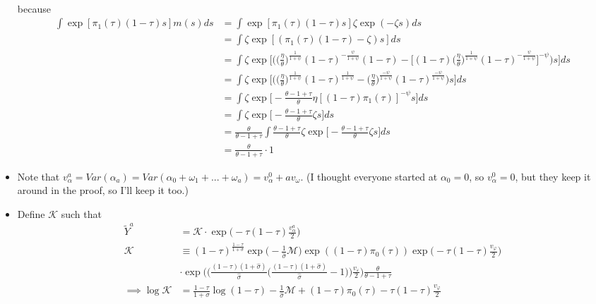 \documentclass{article}
\newcommand{\M}{\mathcal{M}}
\begin{document}
\begin{itemize}
\begin{align*}
\end{align*}
because
\begin{align*}
\int \exp[  \pi_1(\tau)  (1-\tau)s ] m(s)ds 
&= \int \exp[  \pi_1(\tau)  (1-\tau)s ] \zeta \exp(-\zeta s) ds \\
&= \int \zeta \exp[(\pi_1(\tau)  (1-\tau)-\zeta) s] ds \\
&= \int \zeta \exp\Bigg[\Bigg(\Bigg( \frac{\eta}{\theta} \Bigg)^{\frac{1}{1+\psi}}(1-\tau)^{-\frac{\psi}{1+\psi}}  (1-\tau)-\Big[(1-\tau)\Bigg( \frac{\eta}{\theta} \Bigg)^{\frac{1}{1+\psi}}(1-\tau)^{-\frac{\psi}{1+\psi}}\Big]^{-\psi}\Bigg) s\Bigg] ds \\
&= \int \zeta \exp\Bigg[\Bigg(\Bigg( \frac{\eta}{\theta} \Bigg)^{\frac{1}{1+\psi}}(1-\tau)^{\frac{1}{1+\psi}}  -\Bigg( \frac{\eta}{\theta} \Bigg)^{\frac{-\psi}{1+\psi}}(1-\tau)^{\frac{ - \psi}{1+\psi}}\Bigg) s\Bigg] ds \\
&= \int \zeta \exp\Bigg[- \frac{\theta - 1 + \tau}{\theta}\eta[(1-\tau)\pi_1(\tau)]^{-\psi} s\Bigg] ds \\
&= \int \zeta \exp\Bigg[- \frac{\theta - 1 + \tau}{\theta}\zeta s\Bigg] ds \\
&= \frac{\theta}{\theta - 1 + \tau} \int \frac{\theta - 1 + \tau}{\theta}\zeta \exp\Bigg[- \frac{\theta - 1 + \tau}{\theta}\zeta s\Bigg] ds \\
&= \frac{\theta}{\theta - 1 + \tau} \cdot 1
\end{align*}
\item Note that $v_\alpha^a = Var(\alpha_a) = Var(\alpha_0 + \omega_{1} + ... +\omega_{a}) = v_\alpha^0 + a v_\omega$. (I thought everyone started at $\alpha_0 = 0$, so $v_\alpha^0 = 0$, but they keep it around in the proof, so I'll keep it too.)
\item Define $\mathcal{K}$ such that
\begin{align*}
\tilde Y^a &= \mathcal{K} \cdot \exp \Big(-\tau(1-\tau)\frac{v_\alpha^a}{2}\Big)\\
\mathcal{K}  &\equiv  (1-\tau)^{\frac{1-\tau}{1+\sigma}} \exp\Big(-\frac{1}{\hat\sigma} \M\Big)\exp((1-\tau)\pi_0(\tau))
\exp\Big(-\tau(1-\tau)\frac{v_\varphi}{2}\Big) \\
& \cdot \exp\Big( \Big( \frac{(1-\tau)(1+\hat\sigma)}{\hat \sigma}\Big(\frac{(1-\tau)(1+\hat\sigma)}{\hat \sigma} - 1 \Big)\Big) \frac{v_\varepsilon}{2} \Big)  \frac{\theta}{\theta - 1 + \tau}\\
\implies
\log \mathcal{K} &=  \frac{1-\tau}{1+\sigma} \log(1-\tau) -\frac{1}{\hat\sigma} \M + (1-\tau)\pi_0(\tau) -\tau(1-\tau)\frac{v_\varphi}{2} \\

\end{align*}
\end{itemize}
\end{document}
